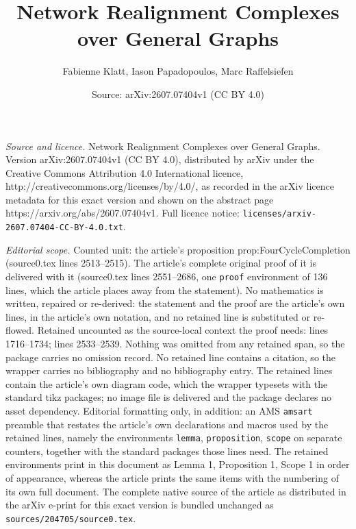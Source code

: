 \documentclass[10pt,a4paper]{amsart}
\title{Network Realignment Complexes over General Graphs}
\author{Fabienne Klatt, Iason Papadopoulos, Marc Raffelsiefen}
\date{Source: arXiv:2607.07404v1 (CC BY 4.0)}
\begin{document}
\maketitle

\noindent\emph{Source and licence.} Network Realignment Complexes over General Graphs. Version arXiv:2607.07404v1 (CC BY 4.0), distributed by arXiv under the Creative Commons Attribution 4.0 International licence, http://creativecommons.org/licenses/by/4.0/, as recorded in the arXiv licence metadata for this exact version and shown on the abstract page https://arxiv.org/abs/2607.07404v1. Full licence notice: \texttt{licenses/arxiv-2607.07404-CC-BY-4.0.txt}.\par\smallskip

\noindent\textit{Editorial scope.} Counted unit: the article's proposition prop:FourCycleCompletion (source0.tex lines 2513--2515). The article's complete original proof of it is delivered with it (source0.tex lines 2551--2686, one \texttt{proof} environment of 136 lines, which the article places away from the statement). No mathematics is written, repaired or re-derived: the statement and the proof are the article's own lines, in the article's own notation, and no retained line is substituted or re-flowed.  Retained uncounted as the source-local context the proof needs: lines 1716--1734; lines 2533--2539.  Nothing was omitted from any retained span, so the package carries no omission record.  No retained line contains a citation, so the wrapper carries no bibliography and no bibliography entry.  The retained lines contain the article's own diagram code, which the wrapper typesets with the standard tikz packages; no image file is delivered and the package declares no asset dependency.  Editorial formatting only, in addition: an AMS \texttt{amsart} preamble that restates the article's own declarations and macros used by the retained lines, namely the environments \texttt{lemma}, \texttt{proposition}, \texttt{scope} on separate counters, together with the standard packages those lines need.  The retained environments print in this document as Lemma 1, Proposition 1, Scope 1 in order of appearance, whereas the article prints the same items with the numbering of its own full document.  The complete native source of the article as distributed in the arXiv e-print for this exact version is bundled unchanged as \texttt{sources/204705/source0.tex}.
\end{document}
